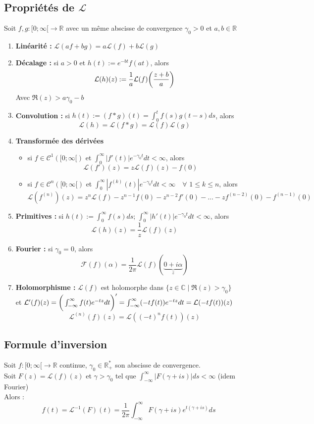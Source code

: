 \subsection{Propriétés de $\mathcal{L}$}
Soit $f,g : [0;\infty[ \to \mathbb{R}$ avec un même abscisse de convergence $\gamma_0 > 0$ et $a,b \in \mathbb{R}$
\begin{enumerate}
    \item \textbf{Linéarité :} $\mathcal{L}(af+bg) = a \mathcal{L}(f) + b \mathcal{L}(g)$
    \item \textbf{Décalage :} si $a > 0$ et $h(t) := e^{-bt}f(at)$, alors
    $$\mathcal{L}(h)(z) := \frac{1}{a} \mathcal{L}(f)\bigg{(}\frac{z+b}{a}\bigg{)}$$
    Avec $\Re(z) > a\gamma_0-b$
    \item \textbf{Convolution :} si $h(t) := (f \ast g)(t) = \int_0^t f(s)g(t-s)ds$, alors
    $$\mathcal{L}(h) = \mathcal{L}(f \ast g) = \mathcal{L}(f) \mathcal{L}(g)$$
    \item \textbf{Transformée des dérivées}
    \begin{itemize}
        \item si $f \in \mathcal{C}^1([0;\infty[)$ et $\int_0^{\infty} |f'(t)|e^{-\gamma_0 t}dt < \infty$, alors
        $$\mathcal{L}(f')(z) = z \mathcal{L}(f)(z) - f(0)$$
        \item si $f \in \mathcal{C}^n([0;\infty[)$ et $\int_0^{\infty} |f^{(k)}(t)|e^{-\gamma_0 t}dt < \infty \quad \forall$ $1 \leq k \leq n$, alors
        $$\mathcal{L}(f^{(n)})(z) = z^n \mathcal{L}(f) - z^{n-1}f(0) - z^{n-2}f'(0) -...- zf^{(n-2)}(0) - f^{(n-1)}(0)$$
    \end{itemize}
    \item \textbf{Primitives :} si $h(t) := \int_0^{\infty}f(s)ds$; $\int_0^{\infty} |h'(t)|e^{-\gamma_0 t}dt < \infty$, alors
    $$\mathcal{L}(h)(z) = \frac{1}{z}\mathcal{L}(f)(z)$$
    \item \textbf{Fourier :} si $\gamma_0 = 0$, alors
    $$\mathcal{F}(f)(\alpha) = \frac{1}{2\pi}\mathcal{L}(f)(\underbrace{0+i\alpha}_z)$$
    \item \textbf{Holomorphisme :} $\mathcal{L}(f)$ est holomorphe dans $\{z \in \mathbb{C} \mid \Re(z) > \gamma_0\}$ \\
    et $\mathcal{L}'(f)(z) = \bigg{(}\int_{-\infty}^{\infty}f(t)e^{-tz}dt \bigg{)}' = \int_{-\infty}^{\infty}(-tf(t))e^{-tz}dt = \mathcal{L}(-tf(t))(z)$
    $$\mathcal{L}^{(n)}(f)(z) = \mathcal{L}((-t)^nf(t))(z)$$
\end{enumerate}

\subsection{Formule d'inversion}
Soit $f : [0;\infty[ \to \mathbb{R}$ continue, $\gamma_0 \in \mathbb{R}_+^*$ son abscisse de convergence. \\
Soit $F(z) = \mathcal{L}(f)(z)$ et $\gamma > \gamma_0$ tel que $\int_{-\infty}^{\infty}|F(\gamma + is)|ds < \infty$ (idem Fourier) \\
Alors :
$$f(t) = \mathcal{L}^{-1}(F)(t) = \frac{1}{2\pi}\int_{-\infty}^{\infty}F(\gamma + is)e^{t(\gamma+is)}ds$$

